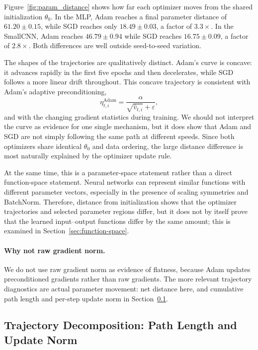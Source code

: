 \documentclass[11pt]{article}
\begin{document}
Figure~\ref{fig:param_distance} shows how far each optimizer moves from the shared initialization $\theta_0$.
In the MLP, Adam reaches a final parameter distance of $61.20 \pm 0.15$, while SGD reaches only $18.49 \pm 0.03$, a factor of $3.3\times$.
In the SmallCNN, Adam reaches $46.79 \pm 0.94$ while SGD reaches $16.75 \pm 0.09$, a factor of $2.8\times$.
Both differences are well outside seed-to-seed variation.

The shapes of the trajectories are qualitatively distinct. Adam's curve is concave: it advances rapidly in the first five epochs and then decelerates, while SGD follows a more linear drift throughout. This concave trajectory is consistent with Adam's adaptive preconditioning,
\[
  \eta^{\mathrm{Adam}}_{t,i} = \frac{\alpha}{\sqrt{\hat{v}_{t,i}} + \varepsilon},
\]
and with the changing gradient statistics during training. We should not interpret the curve as evidence for one single mechanism, but it does show that Adam and SGD are not simply following the same path at different speeds. Since both optimizers share identical $\theta_0$ and data ordering, the large distance difference is most naturally explained by the optimizer update rule.

At the same time, this is a parameter-space statement rather than a direct function-space statement. Neural networks can represent similar functions with different parameter vectors, especially in the presence of scaling symmetries and BatchNorm. Therefore, distance from initialization shows that the optimizer trajectories and selected parameter regions differ, but it does not by itself prove that the learned input--output functions differ by the same amount; this is examined in Section~\ref{sec:function-space}.

\paragraph{Why not raw gradient norm.} We do not use raw gradient norm as evidence of flatness, because Adam updates preconditioned gradients rather than raw gradients. The more relevant trajectory diagnostics are actual parameter movement: net distance here, and cumulative path length and per-step update norm in Section~\ref{sec:path-length}.

\subsection{Trajectory Decomposition: Path Length and Update Norm}
\label{sec:path-length}
\end{document}
